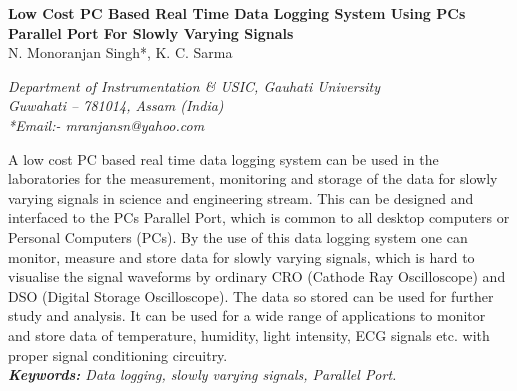 \documentclass[10pt,a4paper]{article}
\begin{document}
\begin{titlepage}
\pagestyle{empty}
\begin{center}
{\large{\textbf{Low Cost PC Based Real Time 
Data Logging System Using PCs Parallel Port For Slowly Varying Signals}}}
\bigskip\bigskip \\

N. Monoranjan Singh*, K. C. Sarma\\

\bigskip

\textit{Department of Instrumentation \& USIC, Gauhati University\\ Guwahati – 781014, Assam (India)\\ *Email:- mranjansn@yahoo.com}\\

\vspace{1.5 cm}

\end{center}
\abstract
\bigskip
A low cost PC based real time data logging system can be used in the laboratories for the measurement, monitoring and storage of the data for slowly varying signals in science and engineering stream. This can be designed and interfaced to the PCs Parallel Port, which is common to all desktop computers or Personal Computers (PCs). By the use of this data logging system one can monitor, measure and store data for slowly varying signals, which is hard to visualise the signal waveforms by ordinary CRO (Cathode Ray Oscilloscope) and DSO (Digital Storage Oscilloscope). The data so stored can be used for further study and analysis. It can be used for a wide range of applications to monitor and store data of temperature, humidity, light intensity, ECG signals etc. with proper signal conditioning circuitry.\\ 

\emph{\textbf{Keywords:} Data logging, slowly varying signals, Parallel Port.}
\end{titlepage}


\newpage
\setcounter{page}{1}
\end{document}
